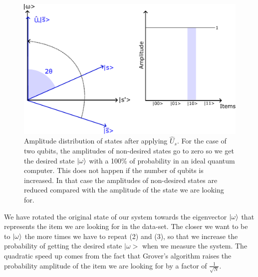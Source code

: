 \begin{figure}[H]
\centering
    \includegraphics[scale=0.55]{Figures/Grover_Step3.pdf}
    \caption{Amplitude distribution of states after applying $\hat{U}_{s}$. For the case of two qubits, the amplitudes of non-desired states go to zero so we get the desired state $\ket{\omega}$ with a 100\% of probability in an ideal quantum computer. This does not happen if the number of qubits is increased. In that case the amplitudes of non-desired states are reduced compared with the amplitude of the state we are looking for.}
    \label{fig:Grover_step3}
\end{figure}

We have rotated the original state of our system towards the eigenvector $\ket{\omega}$ that represents the item we are looking for in the data-set. The closer we want to be to $\ket{\omega}$ the more times we have to repeat (2) and (3), so that we increase the probability of getting the desired state $|\omega>$ when we measure the system. The quadratic speed up comes from the fact that Grover's algorithm raises the probability amplitude of the item we are looking for by a factor of $\frac{1}{\sqrt{N}}$.



